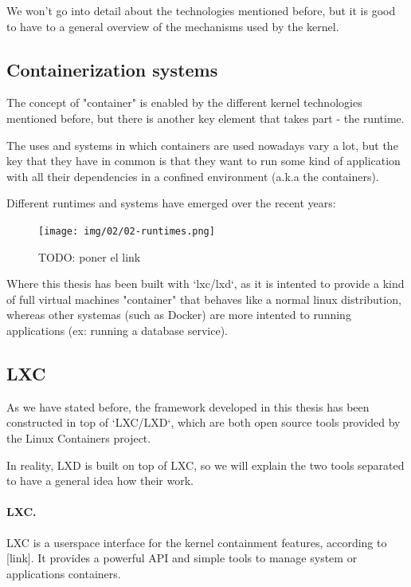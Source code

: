 We won't go into detail about the technologies mentioned before, but it is good to have to a general overview of the mechanisms used by the kernel.


\bigskip
\subsection{Containerization systems}
The concept of "container" is enabled by the different kernel technologies mentioned before, but there is another key element that takes part - the runtime.

The uses and systems in which containers are used nowadays vary a lot, but the key that they have in common is that they want to run some kind of application with all their dependencies in a confined environment (a.k.a the containers). 

Different runtimes and systems have emerged over the recent years:
\begin{figure}[H]
\label{fig:Runtimes containers landscape}
\centering
\texttt{[image: img/02/02-runtimes.png]}
\caption[Runtimes lansdcape]{\footnotesize{TODO: poner el link}}
\end{figure}

Where this thesis has been built with `lxc/lxd`, as it is intented to provide a kind of full virtual machines "container" that behaves like a normal linux distribution, whereas other systemas (such as Docker) are more intented to running applications (ex: running a database service).

\subsection{LXC}
As we have stated before, the framework developed in this thesis has been constructed in top of `LXC/LXD`, which are both open source tools provided by the Linux Containers project.

In reality, LXD is built on top of LXC, so we will explain the two tools separated to have a general idea how their work. 

\paragraph{LXC.} LXC is a userspace interface for the kernel containment features, according to [link]. It provides a powerful API and simple tools to manage system or applications containers. 

